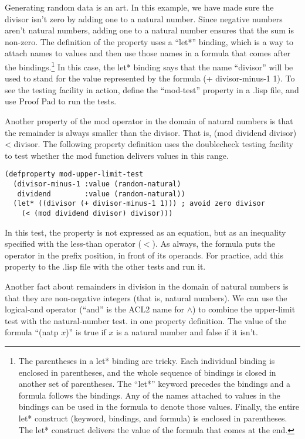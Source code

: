 Generating random data is an art.
In this example, we have made sure the divisor isn't zero
by adding one to a natural number.
Since negative numbers aren't natural numbers, adding one
to a natural number ensures that the sum is non-zero.
\label{let-example-brief-explain}
The definition of the property uses a ``let*'' binding,
which is a way to attach names to values
and then use those names in a formula that comes after the bindings.\footnote{The
parentheses in a let* binding
are tricky. Each individual binding is enclosed in parentheses,
and the whole sequence of bindings is closed in another set
of parentheses. The ``let*'' keyword precedes the bindings
and a formula follows the bindings.
Any of the names attached to values in the bindings
can be used in the formula to denote those values.
Finally, the entire let* construct (keyword, bindings, and formula)
is enclosed in parentheses.
The let* construct delivers the value of the formula
that comes at the end.
}
In this case, the let* binding says that
the name ``divisor'' will be used to stand for
the value represented by the formula (+ divisor-minus-1 1).
To see the testing facility in action,
define the ``mod-test'' property in a .lisp file,
and use Proof Pad to run the tests.

Another property of the mod operator
in the domain of natural numbers
is that the remainder
is always smaller than the divisor.
That is, (mod dividend divisor) < divisor.
The following property definition uses
the doublecheck testing facility
to test whether the mod function delivers values in this range.

\begin{Verbatim}
(defproperty mod-upper-limit-test
  (divisor-minus-1 :value (random-natural)
   dividend        :value (random-natural))
  (let* ((divisor (+ divisor-minus-1 1))) ; avoid zero divisor
    (< (mod dividend divisor) divisor)))
\end{Verbatim}

In this test, the property is not expressed as an equation,
but as an inequality
specified with the less-than operator ($<$).
As always, the formula puts the operator in the prefix position,
in front of its operands.
For practice, add this property to the .lisp file with the other tests and run it.

Another fact about remainders in division in the domain of natural numbers is that
they are non-negative integers (that is, natural numbers).
We can use the logical-and operator (``and'' is the ACL2 name for $\wedge$)
to combine the upper-limit test with the natural-number test.
in one property definition.
\label{natp-op}
The value of the formula ``(natp $x$)'' is true
if $x$ is a natural number and false if it isn't.

